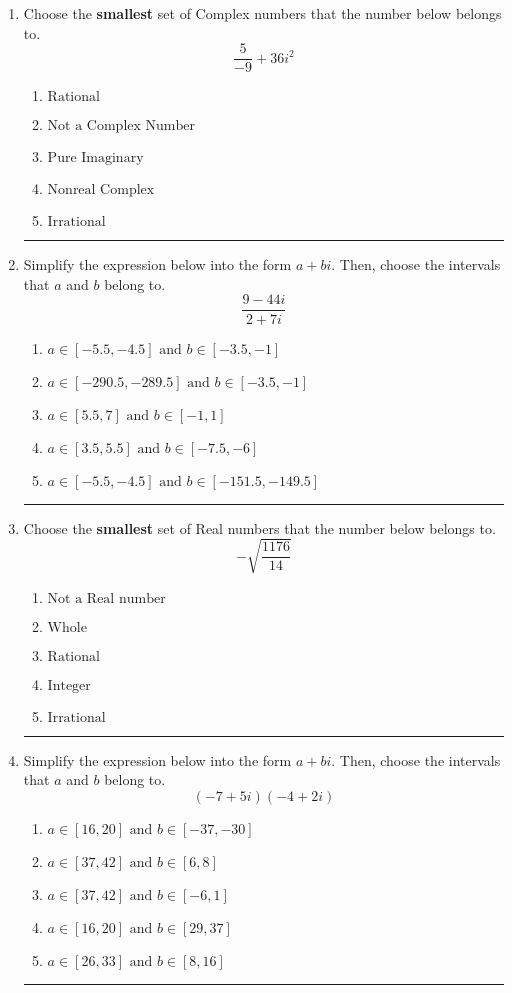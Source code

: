 \documentclass[14pt]{extbook}
\newcommand{\litem}[1]{\item#1\hspace*{-1cm}\rule{\textwidth}{0.4pt}}
\begin{document}
\begin{enumerate}
{\begin{enumerate}[label=\Alph*.]
\end{enumerate} }
\litem{
Choose the \textbf{smallest} set of Complex numbers that the number below belongs to.\[ \frac{5}{-9}+36i^2 \]\begin{enumerate}[label=\Alph*.]
\item \( \text{Rational} \)
\item \( \text{Not a Complex Number} \)
\item \( \text{Pure Imaginary} \)
\item \( \text{Nonreal Complex} \)
\item \( \text{Irrational} \)

\end{enumerate} }
\litem{
Simplify the expression below into the form $a+bi$. Then, choose the intervals that $a$ and $b$ belong to.\[ \frac{9 - 44 i}{2 + 7 i} \]\begin{enumerate}[label=\Alph*.]
\item \( a \in [-5.5, -4.5] \text{ and } b \in [-3.5, -1] \)
\item \( a \in [-290.5, -289.5] \text{ and } b \in [-3.5, -1] \)
\item \( a \in [5.5, 7] \text{ and } b \in [-1, 1] \)
\item \( a \in [3.5, 5.5] \text{ and } b \in [-7.5, -6] \)
\item \( a \in [-5.5, -4.5] \text{ and } b \in [-151.5, -149.5] \)

\end{enumerate} }
\litem{
Choose the \textbf{smallest} set of Real numbers that the number below belongs to.\[ -\sqrt{\frac{1176}{14}} \]\begin{enumerate}[label=\Alph*.]
\item \( \text{Not a Real number} \)
\item \( \text{Whole} \)
\item \( \text{Rational} \)
\item \( \text{Integer} \)
\item \( \text{Irrational} \)

\end{enumerate} }
\litem{
Simplify the expression below into the form $a+bi$. Then, choose the intervals that $a$ and $b$ belong to.\[ (-7 + 5 i)(-4 + 2 i) \]\begin{enumerate}[label=\Alph*.]
\item \( a \in [16, 20] \text{ and } b \in [-37, -30] \)
\item \( a \in [37, 42] \text{ and } b \in [6, 8] \)
\item \( a \in [37, 42] \text{ and } b \in [-6, 1] \)
\item \( a \in [16, 20] \text{ and } b \in [29, 37] \)
\item \( a \in [26, 33] \text{ and } b \in [8, 16] \)


\end{enumerate}}
\end{enumerate}
\end{document}
